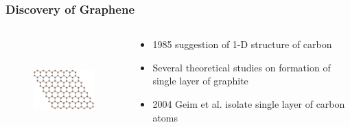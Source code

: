 \documentclass{beamer}
\begin{document}
\begin{frame}
\frametitle{Discovery of Graphene}
\begin{columns}
	\begin{column}{0.48\textwidth}
	\begin{figure}
		\includegraphics[height=4cm, width=4cm]{../present_figs/grapheneSheet}
		\caption{\cite{Fukidome2012}}
	\end{figure}
	\end{column}
	\begin{column}{0.48\textwidth}
		\begin{itemize}
            \item 1985 suggestion of 1-D structure of carbon
            \item Several theoretical studies on formation of single layer of graphite
            \item 2004 Geim et al. isolate single layer of carbon atoms
        \end{itemize}
	\end{column}
\end{columns}
\end{frame}
\end{document}

